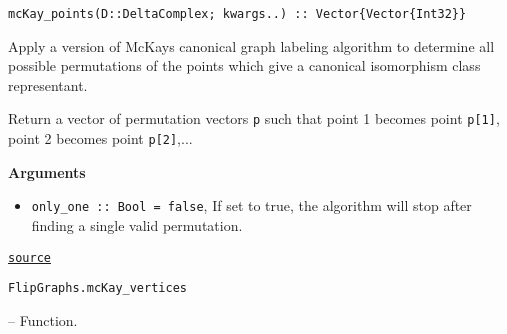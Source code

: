 \begin{adjustwidth}{2em}{0pt}


\begin{verbatim}
mcKay_points(D::DeltaComplex; kwargs..) :: Vector{Vector{Int32}}
\end{verbatim}

Apply a version of McKay{\textquotesingle}s canonical graph labeling algorithm to determine all possible permutations  of the points which give a canonical isomorphism class representant.

Return a vector of permutation vectors \texttt{p} such that point 1 becomes point \texttt{p[1]}, point 2 becomes point \texttt{p[2]},...

\textbf{Arguments}

\begin{itemize}
\item \texttt{only\_one :: Bool = false}, If set to true, the algorithm will stop after finding a single valid permutation.

\end{itemize}


\href{https://github.com/schto223/FlipGraphs.jl/blob/490c01a7adf74b42f27dda05099165c47ae8133e/src/flipGraph.jl#L734-L744}{\texttt{source}}


\end{adjustwidth}
\hypertarget{15594744299233707772}{\texttt{FlipGraphs.mcKay\_vertices}}  -- {Function.}


